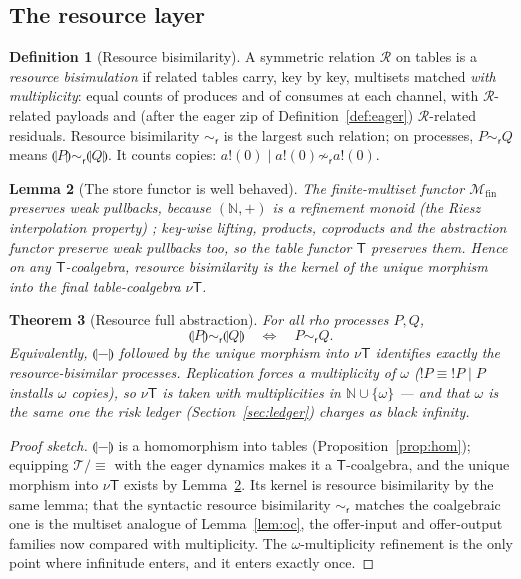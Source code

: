 \documentclass[11pt]{article}
\newcommand{\Par}{\mathbin{\mid}}
\newcommand{\out}[2]{#1\mathbin{!}(#2)}
\newcommand{\sem}[1]{\llparenthesis #1\rrparenthesis}   %
\newcommand{\scong}{\equiv}
\newcommand{\Tab}{\mathsf{T}}                  %
\newcommand{\Mfin}{\mathcal{M}_{\mathrm{fin}}} %
\newcommand{\resbis}{\sim_{\mathsf{r}}}        %
\theoremstyle{plain}
\newtheorem{theorem}{Theorem}
\newtheorem{lemma}[theorem]{Lemma}
\theoremstyle{definition}
\newtheorem{definition}[theorem]{Definition}
\begin{document}
\subsection{The resource layer}

\begin{definition}[Resource bisimilarity]\label{def:resbis}
A symmetric relation $\mathcal R$ on tables is a \emph{resource bisimulation} if
related tables carry, key by key, multisets matched \emph{with multiplicity}: equal
counts of produces and of consumes at each channel, with $\mathcal R$-related
payloads and (after the eager zip of Definition~\ref{def:eager}) $\mathcal
R$-related residuals. Resource bisimilarity $\resbis$ is the largest such relation;
on processes, $P\resbis Q$ means $\sem P\mathrel{\resbis}\sem Q$. It counts copies:
$\out a0\Par\out a0\not\resbis\out a0$.
\end{definition}

\begin{lemma}[The store functor is well behaved]\label{lem:bag-wp}
The finite-multiset functor $\Mfin$ preserves weak pullbacks, because $(\mathbb N,+)$
is a refinement monoid (the Riesz interpolation property) \cite{gummschroder};
key-wise lifting, products, coproducts and the abstraction functor preserve weak
pullbacks too, so the table functor $\Tab$ preserves them. Hence on any
$\Tab$-coalgebra, resource bisimilarity is the kernel of the unique morphism into
the final table-coalgebra $\nu\Tab$.
\end{lemma}

\begin{theorem}[Resource full abstraction]\label{thm:res-fa}
For all rho processes $P,Q$,
\[
  \sem P \resbis \sem Q \quad\Longleftrightarrow\quad P\resbis Q .
\]
Equivalently, $\sem{-}$ followed by the unique morphism into $\nu\Tab$ identifies
exactly the resource-bisimilar processes. Replication forces a multiplicity of
$\omega$ ($!P\scong{!P}\Par P$ installs $\omega$ copies), so $\nu\Tab$ is taken with
multiplicities in $\mathbb N\cup\{\omega\}$ --- and that $\omega$ is the same one
the risk ledger (Section~\ref{sec:ledger}) charges as black infinity.
\end{theorem}
\begin{proof}[Proof sketch]
$\sem{-}$ is a homomorphism into tables (Proposition~\ref{prop:hom}); equipping
$\mathcal T/{\scong}$ with the eager dynamics makes it a $\Tab$-coalgebra, and the
unique morphism into $\nu\Tab$ exists by Lemma~\ref{lem:bag-wp}. Its kernel is
resource bisimilarity by the same lemma; that the syntactic resource bisimilarity
$\resbis$ matches the coalgebraic one is the multiset analogue of
Lemma~\ref{lem:oc}, the offer-input and offer-output families now compared with
multiplicity. The $\omega$-multiplicity refinement is the only point where
infinitude enters, and it enters exactly once.
\end{proof}
\end{document}
